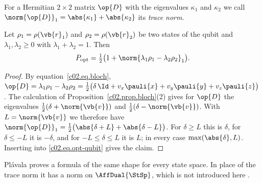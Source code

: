 \begin{vertiefung}[id=c02.v4,
    titel={The qubit optimum as a trace norm},
    wozu={Equation~\eqref{c02.eq.opt-qubit} can be written without coordinates, directly
      with the density matrices of the two states.},
    voraussetzung={Section~\ref{c02.s4.3} and Proposition~\ref{c02.prop.optimum}.
      The core does not need this block.},
    zurueck={The length $\max(\abs{\delta}, \norm{\vb{v}})$ in
      equation~\eqref{c02.eq.opt-qubit} is a property of the matrix
      $\lambda_1\rho_1 - \lambda_2\rho_2$ alone.}]
  For a Hermitian $2\times 2$ matrix $\op{D}$ with the eigenvalues $\kappa_1$ and $\kappa_2$ we
  call $\norm{\op{D}}_1 = \abs{\kappa_1} + \abs{\kappa_2}$ its \emph{trace norm}.

  \begin{proposition}\label{c02.prop.spurnorm}
    Let $\rho_1 = \rho(\vb{r}_1)$ and $\rho_2 = \rho(\vb{r}_2)$ be two states of the qubit
    and $\lambda_1, \lambda_2 \geq 0$ with $\lambda_1 + \lambda_2 = 1$. Then
    \begin{equation}\label{c02.eq.spurnorm}
      P_{\mathrm{opt}} = \tfrac12\bigl(1 + \norm{\lambda_1 \rho_1 - \lambda_2 \rho_2}_1\bigr) .
    \end{equation}
  \end{proposition}
  \begin{proof}
    By equation~\eqref{c02.eq.bloch},
    $\op{D} = \lambda_1\rho_1 - \lambda_2\rho_2
       = \tfrac12\bigl(\delta\, \Id + v_x \pauli{x} + v_y \pauli{y} + v_z \pauli{z}\bigr)$.
    The calculation of Proposition~\ref{c02.prop.bloch}(2) gives for $\op{D}$ the eigenvalues
    $\tfrac12(\delta + \norm{\vb{v}})$ and $\tfrac12(\delta - \norm{\vb{v}})$. With
    $L = \norm{\vb{v}}$ we therefore have
    $\norm{\op{D}}_1 = \tfrac12\bigl(\abs{\delta + L} + \abs{\delta - L}\bigr)$. For
    $\delta \geq L$ this is $\delta$, for $\delta \leq -L$ it is $-\delta$, and for
    $-L \leq \delta \leq L$ it is $L$; in every case $\max(\abs{\delta}, L)$.
    Inserting into \eqref{c02.eq.opt-qubit} gives the claim.
  \end{proof}

  Plávala proves a formula of the same shape for every state space. In place of the trace
  norm it has a norm on $\AffDual{\StSp}$, which is not introduced here
  .
\end{vertiefung}

